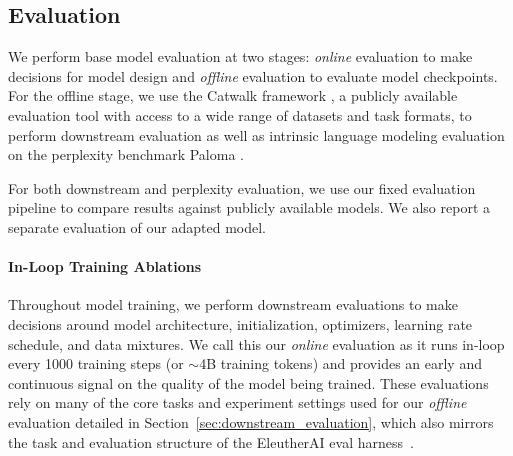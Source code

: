 \documentclass[11pt]{article}
\begin{document}
\subsection{Evaluation}
\label{sec:evaluation}
We perform base model evaluation at two stages: \emph{online} evaluation to make decisions for model design and \emph{offline} evaluation to evaluate model checkpoints. 
For the offline stage, we use the Catwalk framework \citep{groeneveld2023catwalk}, a publicly available evaluation tool with access to a wide range of datasets and task formats, 
to perform downstream evaluation as well as intrinsic language modeling evaluation on the perplexity benchmark Paloma \citep{magnusson2023paloma}.

For both downstream and perplexity evaluation, we use our fixed evaluation pipeline
to compare results against publicly available models. We also report a separate evaluation of our adapted model.  

\paragraph{In-Loop Training Ablations}
\label{sec:ablation}

Throughout model training, we perform downstream evaluations to make decisions around model architecture, initialization, optimizers, learning rate schedule, and data mixtures. We call this our \emph{online} evaluation as it runs in-loop every 1000 training steps (or $\sim$4B training tokens) and provides an early and continuous signal on the quality of the model being trained. These evaluations rely on many of the core tasks and experiment settings used for our \emph{offline} evaluation detailed in Section~\ref{sec:downstream_evaluation}, which also mirrors the task and evaluation structure of the EleutherAI eval harness~\citep{eval-harness}.
\end{document}
